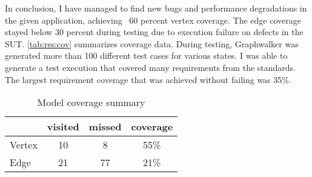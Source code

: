 In conclusion,
I have managed to find new bugs and performance degradations in the given application, achieving ~60 percent vertex coverage.
The edge coverage stayed below 30 percent during testing due to execution failure on defects in the SUT.
\autoref{tab:res:cov} summarizes coverage data.
During testing, Graphwalker was generated more than 100 different test cases for various states.
I was able to generate a test execution that covered many requirements from the standards.
The largest requirement coverage that was achieved without failing was 35\%.

\begin{table}
    \centering
    \caption{Model coverage summary}
    \begin{tabular}{l c c c}
        \toprule
               & visited & missed & coverage \\
        \midrule
        Vertex & 10      & 8      & 55\%     \\
        Edge   & 21      & 77     & 21\%\\
        \bottomrule
    \end{tabular}
    \label{tab:res:cov}
\end{table}